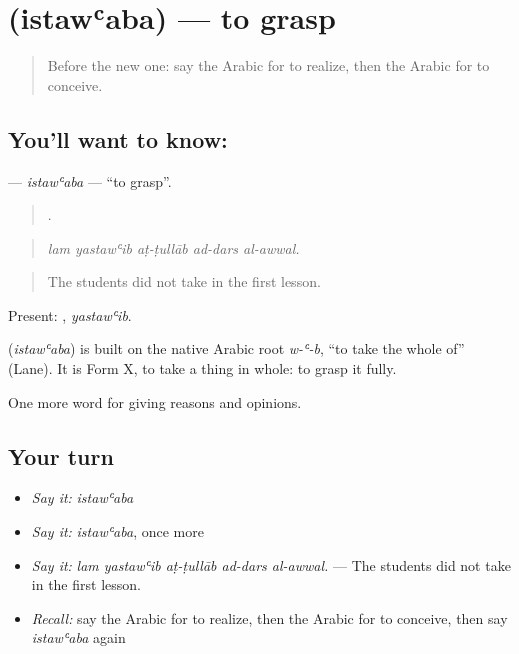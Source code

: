 \section[\texorpdfstring{\ar{استوعب} (istawʿaba)}{استوعب (istawʿaba)}]{ (istawʿaba) — to grasp}

\label{lesson:AR-C367-istawaba}



\begin{quote}
Before the new one: say the Arabic for to realize, then the Arabic for to conceive.
\end{quote}

\subsection*{You'll want to know: }
\textbf{} — \emph{istawʿaba} — \textquotedblleft{}to grasp\textquotedblright{}.

\begin{quote}
    .
\end{quote}

\begin{quote}
\emph{lam yastawʿib aṭ-ṭullāb ad-dars al-awwal.}
\end{quote}

\begin{quote}
The students did not take in the first lesson.
\end{quote}

Present: , \emph{yastawʿib}.

\begin{cousinweb}
\textbf{} (\emph{istawʿaba}) is built on the native Arabic root \emph{w-ʿ-b}, \textquotedblleft{}to take the whole of\textquotedblright{} (Lane). It is Form X, to take a thing in whole: to grasp it fully.
\end{cousinweb}

\begin{grammarlens}[title={What you've built}]
One more word for giving reasons and opinions.
\end{grammarlens}

\subsection*{Your turn}
\begin{itemize}
\raggedright
  \item \emph{Say it:} \emph{istawʿaba}
  \item \emph{Say it:} \emph{istawʿaba}, once more
  \item \emph{Say it:} \emph{lam yastawʿib aṭ-ṭullāb ad-dars al-awwal.} — The students did not take in the first lesson.
  \item \emph{Recall:} say the Arabic for to realize, then the Arabic for to conceive, then say \emph{istawʿaba} again
\end{itemize}

